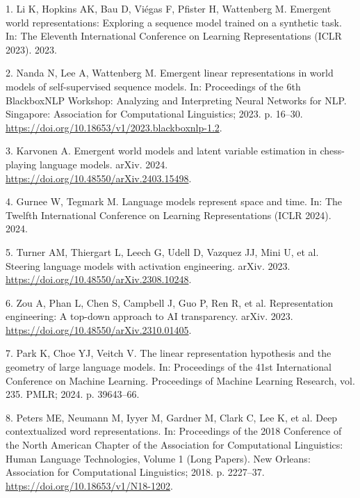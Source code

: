 \documentclass[
  11pt,
]{article}
\newlength{\cslhangindent}
\newenvironment{CSLReferences}[2] %
 {\begin{list}{}{%
  \setlength{\itemindent}{0pt}
  \setlength{\leftmargin}{0pt}
  \setlength{\parsep}{0pt}
  \ifodd #1
   \setlength{\leftmargin}{\cslhangindent}
   \setlength{\itemindent}{-1\cslhangindent}
  \fi
  \setlength{\itemsep}{#2\baselineskip}}}
 {\end{list}}
\begin{document}
\protect{}\label{refs}
\begin{CSLReferences}{0}{1}
1. Li K, Hopkins AK, Bau D, Viégas F, Pfister H, Wattenberg M. Emergent
world representations: Exploring a sequence model trained on a synthetic
task. In: {The Eleventh International Conference on Learning
Representations (ICLR 2023)}. 2023.

2. Nanda N, Lee A, Wattenberg M. Emergent linear representations in
world models of self-supervised sequence models. In: {Proceedings of the
6th BlackboxNLP Workshop: Analyzing and Interpreting Neural Networks for
NLP}. Singapore: Association for Computational Linguistics; 2023. p.
16--30. \url{https://doi.org/10.18653/v1/2023.blackboxnlp-1.2}.

3. Karvonen A. Emergent world models and latent variable estimation in
chess-playing language models. arXiv. 2024.
\url{https://doi.org/10.48550/arXiv.2403.15498}.

4. Gurnee W, Tegmark M. Language models represent space and time. In:
{The Twelfth International Conference on Learning Representations (ICLR
2024)}. 2024.

5. Turner AM, Thiergart L, Leech G, Udell D, Vazquez JJ, Mini U, et al.
Steering language models with activation engineering. arXiv. 2023.
\url{https://doi.org/10.48550/arXiv.2308.10248}.

6. {Zou A, Phan L, Chen S, Campbell J, Guo P, Ren R, et al.}
Representation engineering: A top-down approach to {AI} transparency.
arXiv. 2023. \url{https://doi.org/10.48550/arXiv.2310.01405}.

7. Park K, Choe YJ, Veitch V. The linear representation hypothesis and
the geometry of large language models. In: {Proceedings of the 41st
International Conference on Machine Learning. Proceedings of Machine
Learning Research, vol. 235}. PMLR; 2024. p. 39643--66.

8. Peters ME, Neumann M, Iyyer M, Gardner M, Clark C, Lee K, et al. Deep
contextualized word representations. In: {Proceedings of the 2018
Conference of the North American Chapter of the Association for
Computational Linguistics: Human Language Technologies, Volume 1 (Long
Papers)}. New Orleans: Association for Computational Linguistics; 2018.
p. 2227--37. \url{https://doi.org/10.18653/v1/N18-1202}.


\end{CSLReferences}
\end{document}
